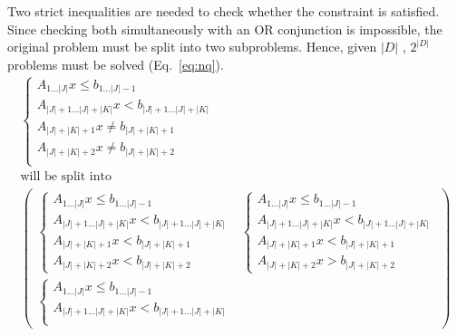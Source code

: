 \documentclass[runningheads]{llncs}
\begin{document}
Two strict inequalities are needed to check whether the constraint is satisfied.
Since checking both simultaneously with an OR conjunction is impossible, the original problem must be split into two subproblems.
Hence, given $|D|$ \nqcs, $2^{|D|}$ problems must be solved (Eq.~\ref{eq:nq}).
\begin{equation}
    \label{eq:nq}
    \begin{gathered}
        \begin{cases}
            A_{1 \dots |J|} x \le b_{1 \dots |J| - 1}                 \\
            A_{|J| + 1\dots |J| + |K|} x < b_{|J| + 1\dots |J| + |K|} \\
            A_{|J| + |K| + 1} x \ne b_{|J| + |K| + 1}                 \\
            A_{|J| + |K| + 2} x \ne b_{|J| + |K| + 2}                 \\
        \end{cases}
        \\
        \text{will be split into}
        \\
        \begin{pmatrix}
            \begin{cases}
                A_{1 \dots |J|} x \le b_{1 \dots |J| - 1}                 \\
                A_{|J| + 1\dots |J| + |K|} x < b_{|J| + 1\dots |J| + |K|} \\
                A_{|J| + |K| + 1} x < b_{|J| + |K| + 1}                   \\
                A_{|J| + |K| + 2} x < b_{|J| + |K| + 2}
            \end{cases}
             &
            \begin{cases}
                A_{1 \dots |J|} x \le b_{1 \dots |J| - 1}                 \\
                A_{|J| + 1\dots |J| + |K|} x < b_{|J| + 1\dots |J| + |K|} \\
                A_{|J| + |K| + 1} x < b_{|J| + |K| + 1}                   \\
                A_{|J| + |K| + 2} x > b_{|J| + |K| + 2}
            \end{cases}
            \\
            \begin{cases}
                A_{1 \dots |J|} x \le b_{1 \dots |J| - 1}                 \\
                A_{|J| + 1\dots |J| + |K|} x < b_{|J| + 1\dots |J| + |K|} \\

\end{cases}
\end{pmatrix}
\end{gathered}
\end{equation}
\end{document}
